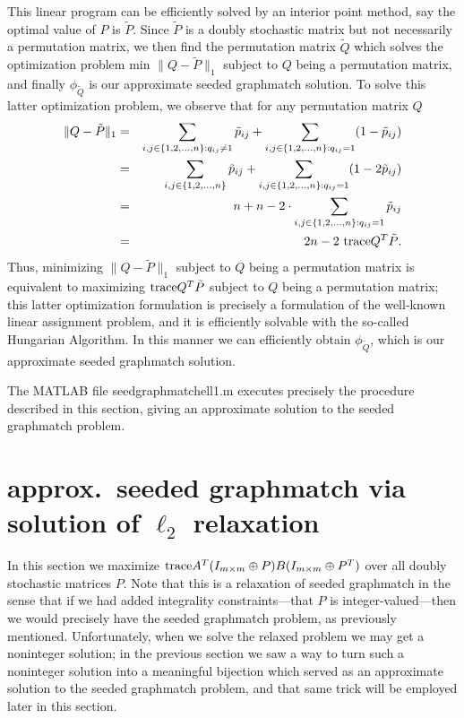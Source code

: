 \documentclass[12pt]{article}
\newcommand{\tr}{\textup{trace}}
\begin{document}
This linear program can be efficiently solved by an interior point method, say the
optimal value of $P$ is $\tilde{P}$. Since $\tilde{P}$ is a doubly stochastic matrix
but not necessarily a permutation matrix, we then find the permutation matrix $\tilde{Q}$ which solves the optimization problem 
min $\| Q - \tilde{P} \|_1$ subject to $Q$ being a permutation
matrix, and finally $\phi_{\tilde{Q}}$ is our approximate
seeded graphmatch solution. To solve this latter 
optimization problem, we observe that for any permutation matrix $Q$
\begin{eqnarray*}
\|Q - \tilde{P}\|_1 & = & \sum_{i,j \in \{1,2,\ldots,n \}:q_{ij}\ne 1}\tilde{p}_{ij}
+ \sum_{i,j \in \{1,2,\ldots,n \}:q_{ij}=1}(1-\tilde{p}_{ij}) \\  & = &
\sum_{i,j \in \{1,2,\ldots,n \}}\tilde{p}_{ij} +
 \sum_{i,j \in \{1,2,\ldots,n \}:q_{ij}=1}(1-2\tilde{p}_{ij}) \\
 & = & n+ n -2 \cdot \sum_{i,j \in \{1,2,\ldots,n \}:q_{ij}=1}\tilde{p}_{ij}\\
 & = & 2n -2 \ \tr Q^T \tilde{P} .
 \end{eqnarray*}
 Thus,  minimizing $\| Q - \tilde{P} \|_1$ subject to $Q$ being a permutation
matrix is equivalent to maximizing $\tr Q^T \tilde{P}$ subject to $Q$ being
a permutation matrix; this latter optimization formulation is precisely
a formulation of the well-known linear assignment problem, and it
is efficiently solvable with the so-called Hungarian Algorithm.
In this manner we can efficiently obtain
$\phi_{\tilde{Q}}$, which is our approximate seeded graphmatch solution.

The MATLAB file seedgraphmatchell1.m executes precisely the procedure
described in this section, giving an approximate solution to the seeded graphmatch
problem.

\section{approx.~seeded graphmatch via solution of $\ell_2$ relaxation \label{ell2}}

In this section we maximize
$\tr A^T(I_{m \times m}\oplus P)B(I_{m \times m}\oplus P^T)$
over all doubly stochastic matrices $P$.
Note that this is a relaxation of seeded graphmatch in the sense that
if we had added integrality constraints---that $P$ is integer-valued---then we
would precisely have the seeded graphmatch problem, as previously mentioned.
Unfortunately, when we solve the relaxed problem we may get a noninteger
solution; in the previous section we saw a way to turn such a noninteger
 solution into  a meaningful bijection which served as an approximate
 solution to the seeded graphmatch problem, and that same trick will
 be employed later in this section.
\end{document}
